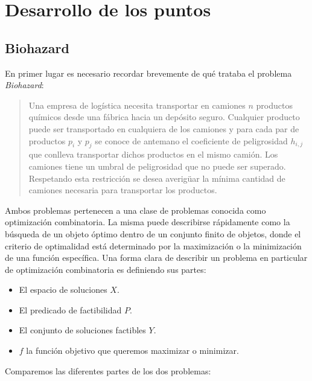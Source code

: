 \section{Desarrollo de los puntos}

\subsection{Biohazard}
En primer lugar es necesario recordar brevemente de qué trataba el problema \emph{Biohazard}:
\begin{quotation}
  Una empresa de logística necesita transportar en camiones $n$ productos químicos desde una fábrica
  hacia un depósito seguro. Cualquier producto puede ser transportado en cualquiera de los camiones
  y para cada par de productos $p_i$ y $p_j$ se conoce de antemano el coeficiente de peligrosidad $h_{i,j}$
  que conlleva transportar dichos productos en el mismo camión. Los camiones tiene un umbral de peligrosidad
  que no puede ser superado. Respetando esta restricción se desea averigüar la mínima cantidad de camiones
  necesaria para transportar los productos.
\end{quotation}
Ambos problemas pertenecen a una clase de problemas conocida como optimización combinatoria. La misma
puede describirse rápidamente como la búsqueda de un objeto óptimo dentro de un conjunto finito de objetos,
donde el criterio de optimalidad está determinado por la maximización o la minimización de una función
específica. Una forma clara de describir un problema en particular de optimización combinatoria es
definiendo sus partes:
\begin{itemize}
  \item El espacio de soluciones $X$.
  \item El predicado de factibilidad $P$.
  \item El conjunto de soluciones factibles $Y$.
  \item $f$ la función objetivo que queremos maximizar o minimizar.
\end{itemize}

Comparemos las diferentes partes de los dos problemas:

